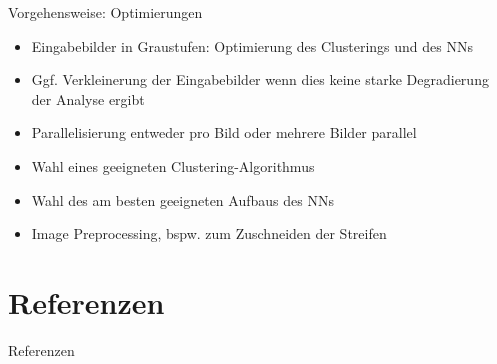 \documentclass[9pt]{beamer}
\begin{document}
\begin{frame}{Vorgehensweise: Optimierungen}
	\begin{itemize}
		\item Eingabebilder in Graustufen: Optimierung des Clusterings und des NNs
		\item Ggf. Verkleinerung der Eingabebilder wenn dies keine starke Degradierung der Analyse ergibt
		\item Parallelisierung entweder pro Bild oder mehrere Bilder parallel
		\item Wahl eines geeigneten Clustering-Algorithmus
		\item Wahl des am besten geeigneten Aufbaus des NNs
		\item Image Preprocessing, bspw. zum Zuschneiden der Streifen
	\end{itemize}
\end{frame}

\section{Referenzen}

\begin{frame}[plain,shrink=40]{Referenzen}
	
	
\end{frame}

	
\end{document}
